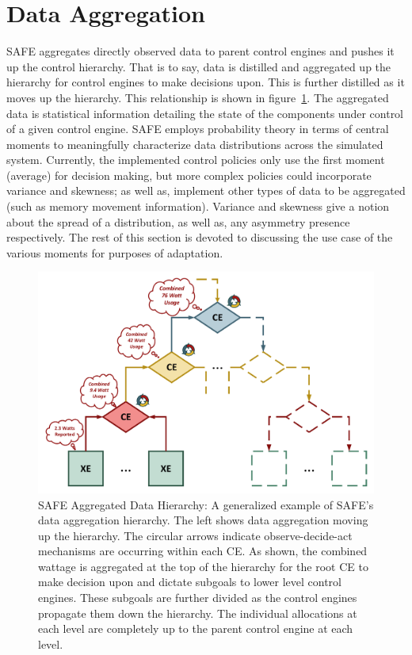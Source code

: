 \section{Data Aggregation}
    SAFE aggregates directly observed data to parent control engines and pushes it up the control hierarchy. That is to say, data is distilled and aggregated up the hierarchy for control engines to make decisions upon. This is further distilled as it moves up the hierarchy. This relationship is shown in figure~\ref{fig:Data-Hierarchy}. The aggregated data is statistical information detailing the state of the components under control of a given control engine. SAFE employs probability theory in terms of central moments to meaningfully characterize data distributions across the simulated system. Currently, the implemented control policies only use the first moment (average) for decision making, but more complex policies could incorporate variance and skewness; as well as, implement other types of data to be aggregated (such as memory movement information). Variance and skewness give a notion about the spread of a distribution, as well as, any asymmetry presence respectively. The rest of this section is devoted to discussing the use case of the various moments for purposes of adaptation. 


     \begin{figure}[htb!]
        \centering
        \includegraphics[width=1.0\textwidth]{Fig/Data_Hierarchy.pdf}
        \caption[SAFE Aggregated Data Hierarchy]{SAFE Aggregated Data Hierarchy: A generalized example of SAFE's data aggregation hierarchy. The left shows data aggregation moving up the hierarchy. The circular arrows indicate observe-decide-act mechanisms are occurring within each CE. As shown, the combined wattage is aggregated at the top of the hierarchy for the root CE to make decision upon and dictate subgoals to lower level control engines. These subgoals are further divided as the control engines propagate them down the hierarchy. The individual allocations at each level are completely up to the parent control engine at each level.}
        \label{fig:Data-Hierarchy}
    \end{figure}
    
